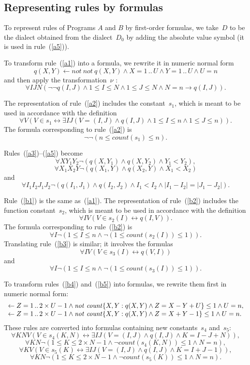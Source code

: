 \documentclass[11pt]{article}
\def\ar{\leftarrow}
\def\lrar{\leftrightarrow}
\def\beq{\begin{equation}}
\def\eeq#1{\label{#1}\end{equation}}
\def\ba{\begin{array}}
\def\ea{\end{array}}
\newcommand{\co}{\ensuremath{\mathit{count}}}
\newcommand{\no}{\ensuremath{\mathit{not}}}
\begin{document}
\begin{adjustwidth}{-1cm}{-1cm}
\section{Representing rules by formulas}
\label{sec:repr}

To represent rules of Programs $A$ and $B$ by first-order formulas, we take~$D$
to be the dialect obtained from the
dialect~$D_0$ \cite[Section~2]{fan26} by adding the absolute value symbol
(it is used in rule~(\ref{a5})).

To transform rule~(\ref{a1}) into a formula, we rewrite it in numeric normal
form
$$q(X,Y) \ar \no\   \no\   q(X,Y) \land X = 1\,..\,U \land Y = 1\,..\,U
\land U=n$$
\cite[Section~4]{fan26} and then apply the
transformation~$\nu$ \cite[Section~5]{fan26}:
\beq
\forall I J N(\neg\neg q(I,J) \land 1\leq I \leq N \land 1 \leq J \leq N
\land N=n \to q(I,J)).
\eeq{a1f}

The representation of rule~(\ref{a2}) includes the constant~$s_1$, which
is meant to be used in accordance with the definition
\beq
\forall V(V\in s_1 \lrar \exists IJ(V=(I,J)\land q(I,J) \land 1\leq I\leq n
\land 1\leq J\leq n)).
\eeq{d1}
The formula corresponding to rule~(\ref{a2}) is
\beq
\neg\neg(n\leq \co(s_1)\leq n).
\eeq{a2f}

Rules~(\ref{a3})--(\ref{a5}) become
\beq
\forall XY_1Y_2\neg(q(X,Y_1) \land q(X,Y_2) \land Y_1 < Y_2),
\eeq{a3f}
\beq
\forall X_1X_2Y\neg(q(X_1,Y) \land q(X_2,Y) \land X_1 < X_2)
\eeq{a4f}
and
\beq
\forall I_1I_2J_1J_2
\neg(q(I_1,J_1) \land q(I_2,J_2) \land I_1<I_2 \land |I_1-I_2|=|J_1-J_2|).
\eeq{a5f}

Rule~(\ref{b1}) is the same as~(\ref{a1}).  The representation
of rule~(\ref{b2}) includes the function constant~$s_2$, which
is meant to be used in accordance with the definition
\beq
\forall IV(V\in s_2(I) \lrar q(I,V)).
\eeq{d2}
The formula corresponding to rule~(\ref{b2}) is
\beq
\forall I\neg(1\leq I\leq n \land \neg (1\leq \co(s_2(I))\leq 1)).
\eeq{b2f}
Translating rule~(\ref{b3}) is similar; it involves the formulas
\beq
\forall IV(V\in s_3(I) \lrar q(V,I))
\eeq{d3}
and 
\beq
\forall I\neg(1\leq I\leq n \land \neg (1\leq \co(s_3(I))\leq 1)).
\eeq{b3f}

To transform rules~(\ref{b4}) and~(\ref{b5}) into formulas, we rewrite them
first in numeric normal form:
$$%
\ba l
\ar Z = 1\,..\,2\times U-1
\land \no\   \co\{ X,Y : q(X,Y) \land Z = X-Y+U \} \leq 1 \land U=n,
\\
\ar Z = 1\,..\,2\times U-1
  \land \no\   \co\{ X,Y : q(X,Y) \land Z = X+Y-1 \} \leq  1 \land U=n.
  \ea
  $$%
These rules are converted into formulas containing new constants~$s_4$
and~$s_5$:
\beq
\forall KNV(V\in s_4(K,N) \lrar \exists IJ(V=(I,J) \land q(I,J)
   \land K=I-J+N)),
\eeq{d4}
\beq
\forall KN\neg(1\leq K\leq 2\times N-1 \land\neg\co(s_4(K,N))\leq 1 \land N=n),
\eeq{b4f}
\beq
\forall KV(V\in s_5(K) \lrar \exists IJ(V=(I,J) \land q(I,J)
   \land K=I+J-1)),
\eeq{d5}
\beq
\forall KN\neg(1\leq K\leq 2\times N-1 \land\neg\co(s_5(K))\leq 1 \land N=n).
\eeq{b5f}


\end{adjustwidth}
\end{document}
